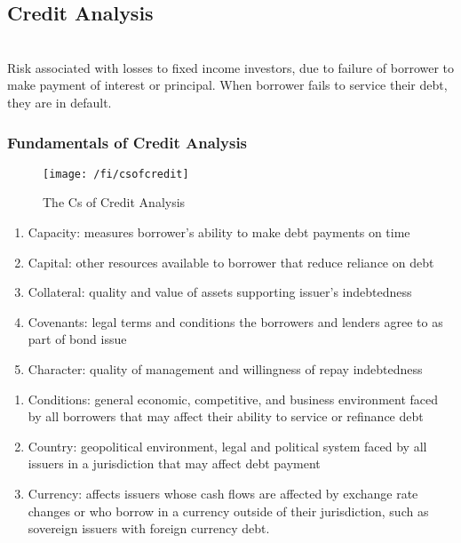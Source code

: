 \subsection{Credit Analysis}

\begin{definition} \\
Risk associated with losses to fixed income investors, due to failure of borrower to make payment of interest or principal. When borrower fails to service their debt, they are in default.
\end{definition}

\subsubsection{Fundamentals of Credit Analysis}

\begin{figure}[H]
\centering
\texttt{[image: /fi/csofcredit]}
\caption{The Cs of Credit Analysis}
\end{figure}

\begin{remark} 
\begin{enumerate}[label=\roman*.]
\setlength{\itemsep}{0pt}
\item Capacity: measures borrower's ability to make debt payments on time
\item Capital: other resources available to borrower that reduce reliance on debt
\item Collateral: quality and value of assets supporting issuer's indebtedness
\item Covenants: legal terms and conditions the borrowers and lenders agree to as part of bond issue
\item Character: quality of management and willingness of repay indebtedness
\end{enumerate}
\end{remark}

\begin{remark} 
\begin{enumerate}[label=\roman*.]
\setlength{\itemsep}{0pt}
\item Conditions: general economic, competitive, and business environment faced by all borrowers that may affect their ability to service or refinance debt
\item Country: geopolitical environment, legal and political system faced by all issuers in a jurisdiction that may affect debt payment
\item Currency: affects issuers whose cash flows are affected by exchange rate changes or who borrow in a currency outside of their jurisdiction, such as sovereign issuers with foreign currency debt.
\end{enumerate}
\end{remark}

